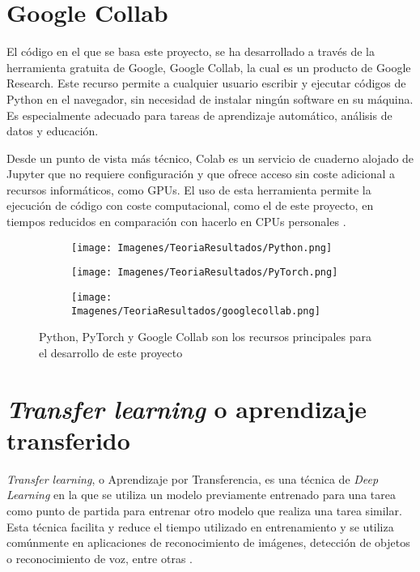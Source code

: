 \documentclass{report}
\begin{document}
\section{Google Collab}

El código en el que se basa este proyecto, se ha desarrollado a través de la herramienta gratuita de Google, Google Collab, la cual es un producto de Google Research. Este recurso permite a cualquier usuario escribir y ejecutar códigos de Python en el navegador, sin necesidad de instalar ningún software en su máquina. Es especialmente adecuado para tareas de aprendizaje automático, análisis de datos y educación. 

Desde un punto de vista más técnico, Colab es un servicio de cuaderno alojado de Jupyter que no requiere configuración y que ofrece acceso sin coste adicional a recursos informáticos, como GPUs. El uso de esta herramienta permite la ejecución de código con coste computacional, como el de este proyecto, en tiempos reducidos en comparación con hacerlo en CPUs personales \cite{GoogleColab}.

\begin{figure}[hbpt]
	 	\centering
	 	\begin{subfigure}[b]{0.45\linewidth}
	 	\centering
	 		\texttt{[image: Imagenes/TeoriaResultados/Python.png]}
	 	\end{subfigure}
	 	\centering
	 	\begin{subfigure}[b]{0.45\linewidth}
	 	\centering
	 		\texttt{[image: Imagenes/TeoriaResultados/PyTorch.png]}
	 	\end{subfigure}
	 	\begin{subfigure}[b]{0.45\linewidth}
	 	\centering
	 		\texttt{[image: Imagenes/TeoriaResultados/googlecollab.png]}
	 	\end{subfigure}
	 	\caption{ Python, PyTorch y Google Collab son los recursos principales para el desarrollo de este proyecto } 
	 	\label{fig:PythonPytorchCollab}
\end{figure}




\section{ \textit{Transfer learning} o aprendizaje transferido}\label{section:ModelosPreentrenados}

\textit{Transfer learning}, o Aprendizaje por Transferencia, es una técnica de \textit{Deep Learning} en la que se utiliza un modelo previamente entrenado para una tarea como punto de partida para entrenar otro modelo que realiza una tarea similar. Esta técnica facilita y reduce el tiempo utilizado en entrenamiento y se utiliza comúnmente en aplicaciones de reconocimiento de imágenes, detección de objetos o reconocimiento de voz, entre otras \cite{TransferLearningMatlab}.
\end{document}
